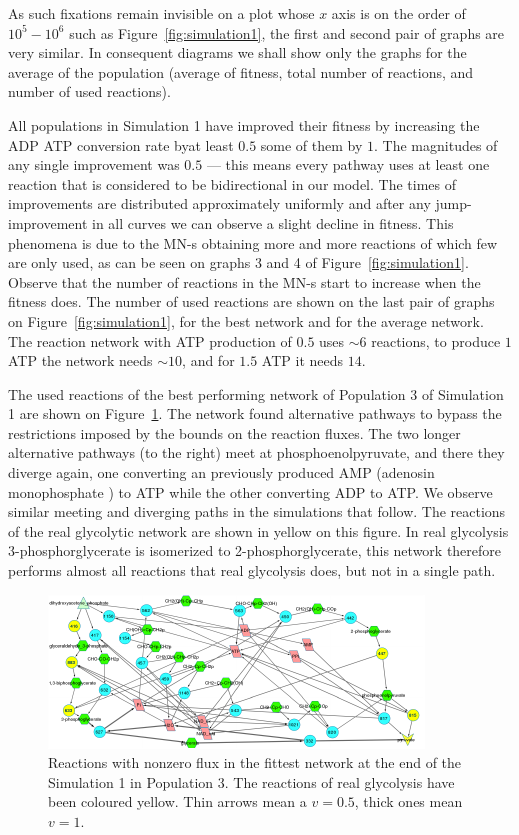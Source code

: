 \documentclass[a4paper,12pt]{article}
\begin{document}
As such fixations remain invisible on a plot whose $x$ axis is on the order of $10^5-10^6$ such as Figure~\ref{fig:simulation1}, the first and second pair of graphs are very similar. In consequent diagrams we shall show only the graphs for the average of the population (average of fitness, total number of reactions, and number of used reactions).

All populations in Simulation 1 have improved their fitness by increasing the ADP ATP conversion rate byat least $0.5$ some of them by $1$. The magnitudes of any single improvement was $0.5$ --- this means every pathway uses at least one reaction that is considered to be bidirectional in our model. The times of improvements are distributed approximately uniformly and after any jump-improvement in all curves we can observe a slight decline in fitness. This phenomena is due to the MN-s obtaining more and more reactions of which few are only used, as can be seen on graphs 3 and 4 of Figure~\ref{fig:simulation1}. Observe that the number of reactions in the MN-s start to increase when the fitness does. The number of used reactions are shown on the last pair of graphs on Figure~\ref{fig:simulation1}, for the best network and for the average network. The reaction network with ATP production of $0.5$ uses $\sim 6$ reactions, to produce $1$ ATP the network needs $\sim 10$, and for $1.5$ ATP it needs $14$. 

The used reactions of the best performing network of Population 3 of Simulation 1 are shown on Figure~\ref{fig:trunk_glyc_final_job1}. The network found alternative pathways to bypass the restrictions imposed by the bounds on the reaction fluxes. The two longer alternative pathways (to the right) meet at phosphoenolpyruvate, and there they diverge again, one converting an previously produced AMP (adenosin monophosphate ) to ATP while the other converting ADP to ATP. We observe similar meeting and diverging paths in the simulations that follow. The reactions of the real glycolytic network are shown in yellow on this figure. In real glycolysis 3-phosphorglycerate is isomerized to 2-phosphorglycerate, this network therefore performs almost all reactions that real glycolysis does, but not in a single path. 



\begin{figure}[htpb]
	\centering
	\includegraphics[width=1\linewidth]{trunk_glyc_final_job1_colored.pdf}
	\caption{Reactions with nonzero flux in the fittest network at the end of the Simulation 1 in Population 3. The reactions of real glycolysis have been coloured yellow. Thin arrows mean a $v=0.5$, thick ones mean $v=1$.}
	\label{fig:trunk_glyc_final_job1}
\end{figure}
\end{document}
